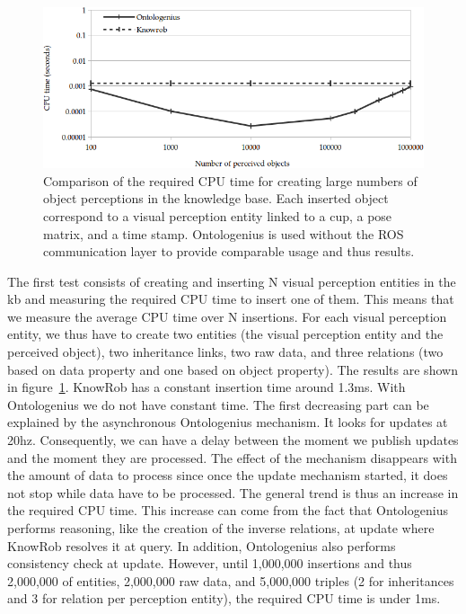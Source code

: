 \begin{figure}[ht!]
\centering
\includegraphics[width=\textwidth]{figures/chapter2/knowrob/Insertion.png}
\caption{\label{fig:chap2_knowrob_insertion} Comparison of the required CPU time for creating large numbers of object perceptions in the knowledge base. Each inserted object correspond to a visual perception entity linked to a cup, a pose matrix, and a time stamp. Ontologenius is used without the ROS communication layer to provide comparable usage and thus results.}
\end{figure}

The first test consists of creating and inserting N visual perception entities in the \acrshort{kb} and measuring the required CPU time to insert one of them. This means that we measure the average CPU time over N insertions. For each visual perception entity, we thus have to create two entities (the visual perception entity and the perceived object), two inheritance links, two raw data, and three relations (two based on data property and one based on object property). The results are shown in figure~\ref{fig:chap2_knowrob_insertion}. KnowRob has a constant insertion time around 1.3ms. With Ontologenius we do not have constant time. The first decreasing part can be explained by the asynchronous Ontologenius mechanism. It looks for updates at 20hz. Consequently, we can have a delay between the moment we publish updates and the moment they are processed. The effect of the mechanism disappears with the amount of data to process since once the update mechanism started, it does not stop while data have to be processed. The general trend is thus an increase in the required CPU time. This increase can come from the fact that Ontologenius performs reasoning, like the creation of the inverse relations, at update where KnowRob resolves it at query. In addition, Ontologenius also performs consistency check at update. However, until 1,000,000 insertions and thus 2,000,000 of entities, 2,000,000 raw data, and 5,000,000 triples (2 for inheritances and 3 for relation per perception entity), the required CPU time is under 1ms.

